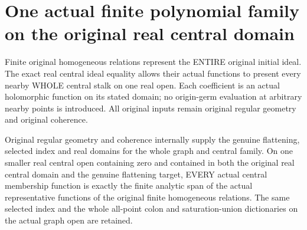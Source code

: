\section{One actual finite polynomial family on the original real central domain}

Finite original homogeneous relations represent the ENTIRE original initial
ideal. The exact real central ideal equality allows their actual functions to
present every nearby WHOLE central stalk on one real open. Each coefficient is
an actual holomorphic function on its stated domain; no origin-germ evaluation
at arbitrary nearby points is introduced. All original inputs remain original
regular geometry and original coherence.

\begin{theorem}
\label{hir:real-domain-original-entire-finite-central-relation-model}
\leanok
Original regular geometry and coherence internally supply the genuine
flattening, selected index and real domains for the whole graph and central
family. On one smaller real central open containing zero and contained in
both the original real central domain and the genuine flattening target,
EVERY actual central membership function is exactly the finite analytic span
of the actual representative functions of the original finite homogeneous
relations. The same selected index and the whole all-point colon and
saturation-union dictionaries on the actual graph open are retained.
\end{theorem}
